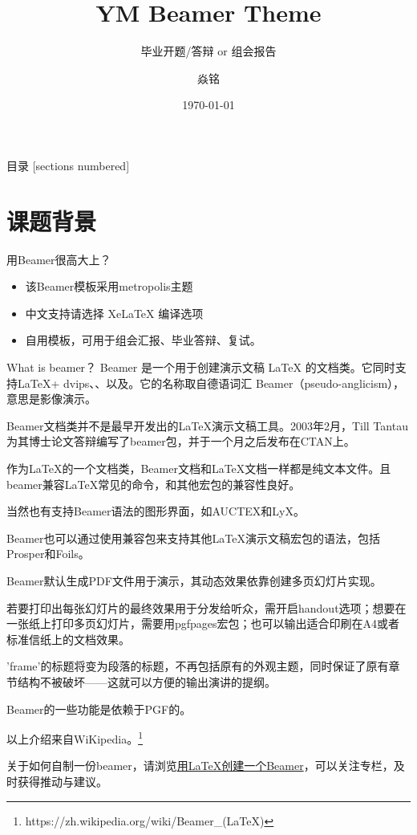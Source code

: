 \documentclass[compress,aspectratio=43,10pt,UTF8]{ctexbeamer}
\title{YM Beamer Theme} %
\subtitle{毕业开题/答辩 or 组会报告} %
\date{\today} %
\author{焱铭} %
\institute{桂林电子科技大学} %
\begin{document}
\maketitle %

\begin{frame}{目录}
  [sections numbered]
  \tableofcontents[hideallsubsections] %
\end{frame}




\section{课题背景}

\begin{frame}{用Beamer很高大上？}
    \begin{itemize}[<+-| alert@+>] %
        \item 该Beamer模板采用metropolis主题
        \item 中文支持请选择 Xe\LaTeX{} 编译选项
        \item 自用模板，可用于组会汇报、毕业答辩、复试。
    \end{itemize}
\end{frame}

\begin{frame}[allowframebreaks]{What is beamer？}
	Beamer 是一个用于创建演示文稿 LaTeX 的文档类。它同时支持\LaTeX + dvips、、以及。它的名称取自德语词汇 Beamer（pseudo-anglicism），意思是影像演示。
	
	Beamer文档类并不是最早开发出的\LaTeX 演示文稿工具。2003年2月，Till Tantau为其博士论文答辩编写了beamer包，并于一个月之后发布在CTAN上。
	
	作为LaTeX的一个文档类，Beamer文档和\LaTeX 文档一样都是纯文本文件。且beamer兼容\LaTeX 常见的命令，和其他宏包的兼容性良好。
	
	当然也有支持Beamer语法的图形界面，如AUCTEX和LyX。
	
	Beamer也可以通过使用兼容包来支持其他LaTeX演示文稿宏包的语法，包括 Prosper和Foils。
	
	Beamer默认生成PDF文件用于演示，其动态效果依靠创建多页幻灯片实现。
	
	若要打印出每张幻灯片的最终效果用于分发给听众，需开启handout选项；想要在一张纸上打印多页幻灯片，需要用pgfpages宏包；也可以输出适合印刷在A4或者标准信纸上的文档效果。
	
	'frame'的标题将变为段落的标题，不再包括原有的外观主题，同时保证了原有章节结构不被破坏——这就可以方便的输出演讲的提纲。
	
	Beamer的一些功能是依赖于PGF的。
	
	以上介绍来自WiKipedia。\footnote{https://zh.wikipedia.org/wiki/Beamer\_(LaTeX)}
	
	关于如何自制一份beamer，请浏览\href{https://zhuanlan.zhihu.com/p/423443762}{用LaTeX创建一个Beamer}，可以关注专栏，及时获得推动与建议。
\end{frame}
\end{document}
